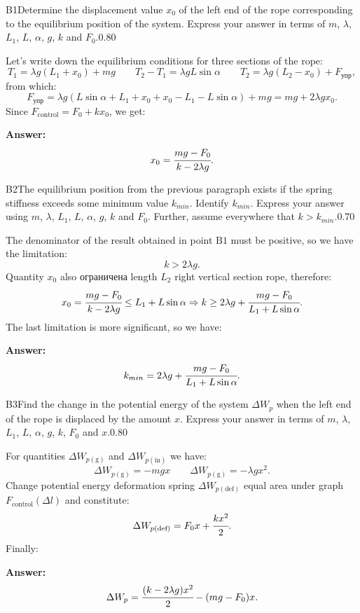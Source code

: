 \documentclass[11pt,a4paper]{article}
\begin{document}
\begin{solcard}{B1}{Determine the displacement value $x_0$ of the left end of the rope corresponding to the equilibrium position of the system. Express your answer in terms of $m$, $\lambda$, $L_1$, $L$, $\alpha$, $g$, $k$ and $F_0$.}{0.80}

Let's write down the equilibrium conditions for three sections of the rope: $$T_1=\lambda g(L_1+x_0)+mg\qquad T_2-T_1=\lambda gL\sin\alpha\qquad T_2=\lambda g(L_2-x_0)+F_\text{упр}{,} $$from which: $$F_\text{упр}=\lambda g(L\sin\alpha+L_1+x_0+x_0-L_1-L\sin\alpha)+mg=mg+2\lambda gx_0{.} $$Since $F_\text{control}=F_0+kx_0$, we get:

\par\smallskip\noindent\textbf{Answer:} $$x_0=\cfrac{mg-F_0}{k-2\lambda g}{.} $$
\end{solcard}

\begin{solcard}{B2}{The equilibrium position from the previous paragraph exists if the spring stiffness exceeds some minimum value $k_{min}$. Identify $k_{min}$. Express your answer using $m$, $\lambda$, $L_1$, $L$, $\alpha$, $g$, $k$ and $F_0$. Further, assume everywhere that $k > k_{min}$.}{0.70}

The denominator of the result obtained in point $\mathrm{B1}$ must be positive, so we have the limitation: $$k>2\lambda g{.} $$Quantity $x_0$ also ограничена length $L_2$ right vertical section rope, therefore: $$x_0=\cfrac{mg-F_0}{k-2\lambda g}\leq L_1+L\sin\alpha\Rightarrow k\geq 2\lambda g+\cfrac{mg-F_0}{L_1+L\sin\alpha}{.} $$The last limitation is more significant, so we have:

\par\smallskip\noindent\textbf{Answer:} $$k_{min}=2\lambda g+\cfrac{mg-F_0}{L_1+L\sin\alpha}{.} $$
\end{solcard}

\begin{solcard}{B3}{Find the change in the potential energy of the system $\Delta{W}_p$ when the left end of the rope is displaced by the amount $x$. Express your answer in terms of $m$, $\lambda$, $L_1$, $L$, $\alpha$, $g$, $k$, $F_0$ and $x$.}{0.80}

For quantities $\Delta{W}_{p(\text{g})}$ and $\Delta{W}_{p(\text{in})}$ we have: $$\Delta{W}_{p(\text{g})}=-mgx\qquad \Delta{W}_{p(\text{g})}=-\lambda gx^2{.} $$Change potential energy deformation spring $\Delta{W}_{p(\text{def})}$ equal area under graph $F_\text{control}(\Delta{l})$ and constitute: $$\Delta{W}_{p(\text{def})}=F_0x+\cfrac{kx^2}{2}{.} $$Finally:

\par\smallskip\noindent\textbf{Answer:} $$\Delta{W}_p=\cfrac{(k-2\lambda g)x^2}{2}-(mg-F_0)x{.} $$
\end{solcard}
\end{document}
